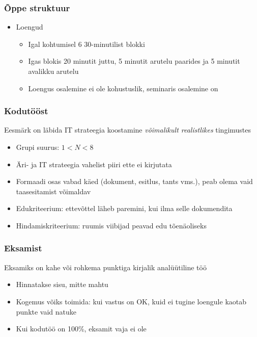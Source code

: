 \begin{frame}[fragile]
  \frametitle{Õppe struktuur}
	\begin{itemize}
	\item Loengud
	\begin{itemize}
		\item Igal kohtumisel 6 30-minutilist blokki
		\item Igas blokis 20 minutit juttu, 5 minutit arutelu paarides ja 5 minutit avalikku arutelu
		\item Loengus osalemine ei ole kohustuslik, seminaris osalemine on
	\end{itemize}
	\end{itemize}
\end{frame}

\begin{frame}[fragile]
  \frametitle{Kodutööst}
Eesmärk on läbida IT strateegia koostamine \emph{võimalikult realistlikes} tingimustes 
  	\begin{itemize}
		\item Grupi suurus: $1<N<8$
		\item Äri- ja IT strateegia vahelist piiri ette ei kirjutata
		\item Formaadi osas vabad käed (dokument, esitlus, tants vms.), peab olema vaid taasesitamist võimaldav
		\item Edukriteerium: ettevõttel läheb paremini, kui ilma selle dokumendita
		\item Hindamiskriteerium: ruumis viibijad peavad edu tõenäoliseks
	\end{itemize}
\end{frame}

\begin{frame}[fragile]
  \frametitle{Eksamist}
  Eksamiks on kahe või rohkema punktiga kirjalik analüütiline töö
  	\begin{itemize}
		\item Hinnatakse sisu, mitte mahtu
		\item Kogemus võiks toimida: kui vastus on OK, kuid ei tugine loengule kaotab punkte vaid natuke
		\item Kui kodutöö on 100\%, eksamit vaja ei ole
	\end{itemize}
\end{frame}


